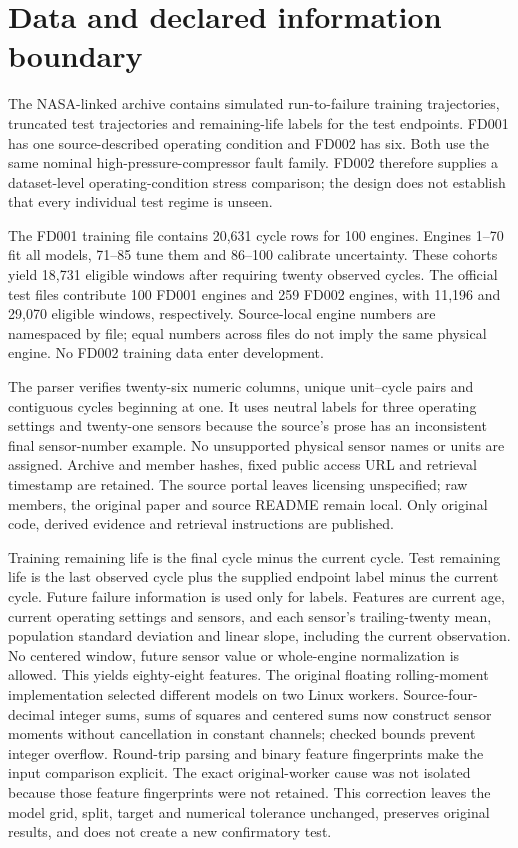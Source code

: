 \documentclass[11pt]{article}
\begin{document}
\section{Data and declared information boundary}
The NASA-linked archive contains simulated run-to-failure training trajectories, truncated test trajectories and remaining-life labels for the test endpoints. FD001 has one source-described operating condition and FD002 has six. Both use the same nominal high-pressure-compressor fault family. FD002 therefore supplies a dataset-level operating-condition stress comparison; the design does not establish that every individual test regime is unseen.

The FD001 training file contains 20,631 cycle rows for 100 engines. Engines 1--70 fit all models, 71--85 tune them and 86--100 calibrate uncertainty. These cohorts yield 18,731 eligible windows after requiring twenty observed cycles. The official test files contribute 100 FD001 engines and 259 FD002 engines, with 11,196 and 29,070 eligible windows, respectively. Source-local engine numbers are namespaced by file; equal numbers across files do not imply the same physical engine. No FD002 training data enter development.

The parser verifies twenty-six numeric columns, unique unit--cycle pairs and contiguous cycles beginning at one. It uses neutral labels for three operating settings and twenty-one sensors because the source's prose has an inconsistent final sensor-number example. No unsupported physical sensor names or units are assigned. Archive and member hashes, fixed public access URL and retrieval timestamp are retained. The source portal leaves licensing unspecified; raw members, the original paper and source README remain local. Only original code, derived evidence and retrieval instructions are published.

Training remaining life is the final cycle minus the current cycle. Test remaining life is the last observed cycle plus the supplied endpoint label minus the current cycle. Future failure information is used only for labels. Features are current age, current operating settings and sensors, and each sensor's trailing-twenty mean, population standard deviation and linear slope, including the current observation. No centered window, future sensor value or whole-engine normalization is allowed. This yields eighty-eight features. The original floating rolling-moment implementation selected different models on two Linux workers. Source-four-decimal integer sums, sums of squares and centered sums now construct sensor moments without cancellation in constant channels; checked bounds prevent integer overflow. Round-trip parsing and binary feature fingerprints make the input comparison explicit. The exact original-worker cause was not isolated because those feature fingerprints were not retained. This correction leaves the model grid, split, target and numerical tolerance unchanged, preserves original results, and does not create a new confirmatory test.
\end{document}
